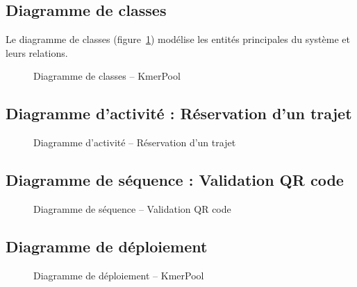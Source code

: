\documentclass[12pt, a4paper]{report}
\begin{document}
\subsection{Diagramme de classes}

Le diagramme de classes (figure~\ref{fig:classes}) modélise les entités principales
du système et leurs relations.

\begin{figure}[H]
  \centering
  \caption{Diagramme de classes -- KmerPool}
  \label{fig:classes}
\end{figure}

\subsection{Diagramme d'activité : Réservation d'un trajet}

\begin{figure}[H]
  \centering
  \caption{Diagramme d'activité -- Réservation d'un trajet}
  \label{fig:activity}
\end{figure}

\subsection{Diagramme de séquence : Validation QR code}

\begin{figure}[H]
  \centering
  \caption{Diagramme de séquence -- Validation QR code}
  \label{fig:sequence}
\end{figure}

\subsection{Diagramme de déploiement}

\begin{figure}[H]
  \centering
  \caption{Diagramme de déploiement -- KmerPool}
  \label{fig:deploy}
\end{figure}
\end{document}
